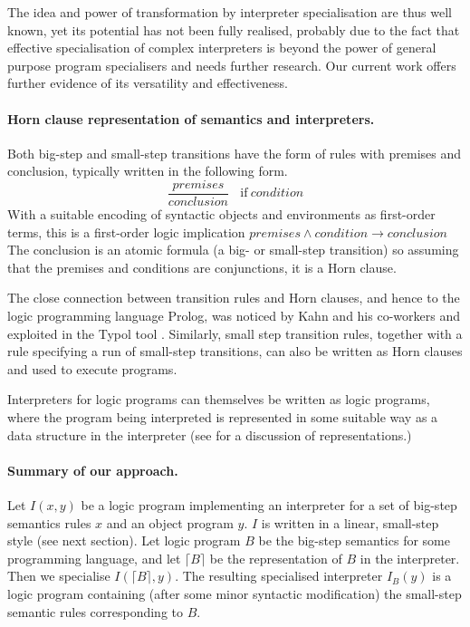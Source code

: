 \documentclass{llncs}
\begin{document}
The idea and power of transformation by interpreter specialisation are thus well known, yet its potential has not been fully realised, probably due to the 
fact that effective specialisation of complex interpreters is beyond the power of general purpose program specialisers and needs 
further research.  Our current work offers further evidence of its versatility and effectiveness.

\paragraph{Horn clause representation of semantics and interpreters.}
Both big-step and small-step transitions have the form of rules with premises and conclusion, typically written in the following form.
\[
\dfrac{\mathit{premises}} 
{\mathit{conclusion}} 
~~~~\mathrm{if }~ \mathit{condition}
\]
With a suitable encoding of syntactic objects and environments as first-order terms, this is a first-order logic implication
$\mathit{premises} \wedge \mathit{condition} \rightarrow \mathit{conclusion}$ 
The conclusion is an atomic formula
(a big- or small-step transition) so assuming that the premises and conditions are conjunctions,
it is a Horn clause.

The close connection between transition rules and Horn clauses, and hence to the logic programming language Prolog, 
was noticed by Kahn and his co-workers and exploited in
the Typol tool \cite{Despeyroux1984}. 
Similarly, small step transition rules, together with a rule specifying a run of
small-step transitions, can also be written as Horn clauses and used to execute programs.

Interpreters for logic programs can themselves be written as logic programs, where the program being interpreted 
is represented in some suitable way as a data structure in the interpreter (see \cite{Hill-Gallagher-Handbook,HillL88} for a discussion
of representations.)

\paragraph{Summary of our approach.}  Let $I(x,y)$ be a logic program implementing an interpreter for a set of
big-step semantics rules $x$ and an object program $y$. $I$ is written in a linear, small-step style (see next section).  
Let logic program $B$ be the big-step semantics
for some programming language, and let $\lceil B \rceil$ be the representation of $B$ in the interpreter.  Then we specialise 
$I(\lceil B \rceil,y)$.  The resulting specialised interpreter $I_B(y)$ is a logic program containing (after some minor syntactic modification) 
the small-step semantic rules
corresponding to $B$.
\end{document}
